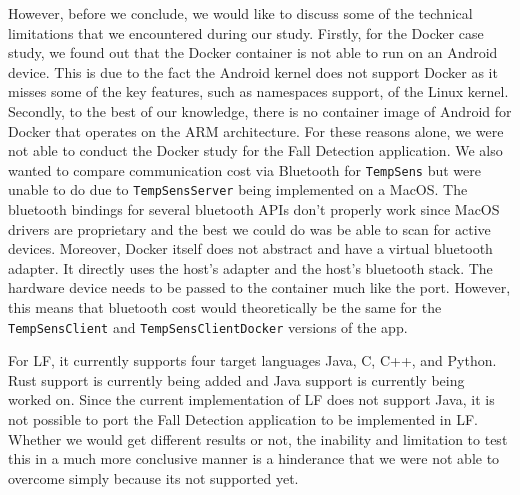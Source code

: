 However, before we conclude, we would like to discuss some of the technical limitations that we encountered during 
our study. Firstly, for the Docker case study, we found out that the Docker container is not able to run on an 
Android device. This is due to the fact the Android kernel does not support Docker as it misses some of the key 
features, such as namespaces support, of the Linux kernel. Secondly, to the best of our knowledge, there is no 
container image of Android for Docker that operates on the ARM architecture. For these reasons alone, we were not 
able to conduct the Docker study for the Fall Detection application. We also wanted to compare communication cost via 
Bluetooth for \texttt{TempSens} but were unable to do due to \texttt{TempSensServer} being implemented on a 
MacOS. The bluetooth bindings for several bluetooth APIs don't properly work since MacOS drivers are proprietary 
and the best we could do was be able to scan for active devices. Moreover, Docker itself does not abstract and 
have a virtual bluetooth adapter. It directly uses the host's adapter and the host's bluetooth stack. The hardware 
device needs to be passed to the container much like the port. However, this means that bluetooth cost would 
theoretically be 
the same for the \texttt{TempSensClient} and \texttt{TempSensClientDocker} versions of the app.

For LF, it currently supports four target languages \textemdash Java, C, C++, and Python. Rust support is currently 
being added and Java support is currently being worked on. Since the current implementation of LF does not support 
Java, it is not possible to port the Fall Detection application to be implemented in LF. Whether we would 
get different results or not, the inability and limitation to test this in a much more conclusive manner is a 
hinderance that we were not able to overcome simply because its not supported yet. \\

